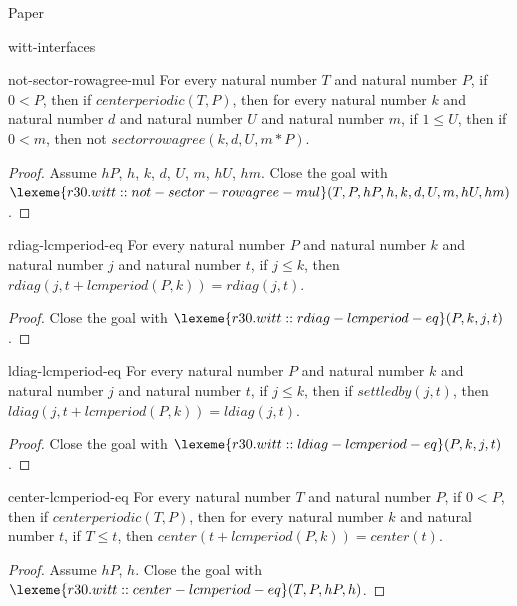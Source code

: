\begin{lexlean}{Paper}
\begin{section}{witt-interfaces}
  \begin{theorem}{not-sector-rowagree-mul}
  For every natural number \(T\) and natural number \(P\), if \(0 < P\), then if \(centerperiodic(T, P)\), then for every natural number \(k\) and natural number \(d\) and natural number \(U\) and natural number \(m\), if \(1 ≤ U\), then if \(0 < m\), then not \(sectorrowagree(k, d, U, m * P)\).
  \begin{proof}
  Assume \(hP\), \(h\), \(k\), \(d\), \(U\), \(m\), \(hU\), \(hm\).
  Close the goal with \(\lexeme{r30.witt::not-sector-rowagree-mul}(T, P, hP, h, k, d, U, m, hU, hm)\).
  \end{proof}
  \end{theorem}

  \begin{theorem}{rdiag-lcmperiod-eq}
  For every natural number \(P\) and natural number \(k\) and natural number \(j\) and natural number \(t\), if \(j ≤ k\), then \(rdiag(j, t + lcmperiod(P, k)) = rdiag(j, t)\).
  \begin{proof}
  Close the goal with \(\lexeme{r30.witt::rdiag-lcmperiod-eq}(P, k, j, t)\).
  \end{proof}
  \end{theorem}

  \begin{theorem}{ldiag-lcmperiod-eq}
  For every natural number \(P\) and natural number \(k\) and natural number \(j\) and natural number \(t\), if \(j ≤ k\), then if \(settledby(j, t)\), then \(ldiag(j, t + lcmperiod(P, k)) = ldiag(j, t)\).
  \begin{proof}
  Close the goal with \(\lexeme{r30.witt::ldiag-lcmperiod-eq}(P, k, j, t)\).
  \end{proof}
  \end{theorem}

  \begin{theorem}{center-lcmperiod-eq}
  For every natural number \(T\) and natural number \(P\), if \(0 < P\), then if \(centerperiodic(T, P)\), then for every natural number \(k\) and natural number \(t\), if \(T ≤ t\), then \(center(t + lcmperiod(P, k)) = center(t)\).
  \begin{proof}
  Assume \(hP\), \(h\).
  Close the goal with \(\lexeme{r30.witt::center-lcmperiod-eq}(T, P, hP, h)\).
  \end{proof}
  \end{theorem}


\end{section}
\end{lexlean}
